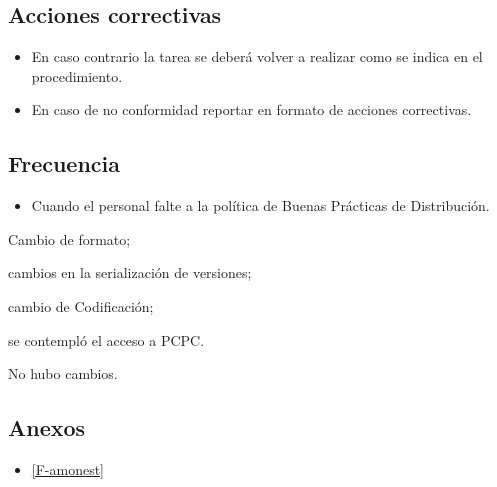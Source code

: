 \subsection{Acciones correctivas}

\begin{itemize}
	\item En caso contrario la tarea se deberá volver a realizar como se indica en el procedimiento.
	\item En caso de no conformidad reportar en formato de acciones correctivas.
\end{itemize}

\subsection{Frecuencia}
\begin{itemize}
	\item Cuando el personal falte a la política de Buenas Prácticas de Distribución.
\end{itemize}

\begin{changelog}[simple, sectioncmd=\subsection*,label=changelog-1.6]
	\begin{version}[v=2.1, date=2023--01, author=Pablo E. Alanis]
			\item Cambio de formato;
			\item cambios en la serialización de versiones;
			\item cambio de Codificación;
			\item se contempló el acceso a PCPC.
	\end{version}

	\begin{version}[v=1.6, date=2022-05, author=Alonso M.]
		\item No hubo cambios.
	\end{version}

\end{changelog}

\subsection*{Anexos}

\begin{itemize}
	\item \cref{F-amonest}
\end{itemize}